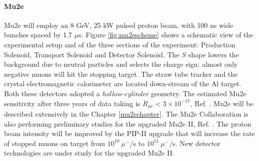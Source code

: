 \paragraph{Mu2e}
Mu2e will employ an 8 GeV, 25 kW pulsed proton beam, with 100 ns wide bunches spaced by 1.7 $\mu$s. 
Figure \ref{fig:mu2escheme} shows a schematic view of the experimental setup and of the
three sections of the experiment: Production Solenoid, Transport
Solenoid and Detector Solenoid. The $S$ shape lowers the background due to 
neutral particles and selects the charge sign: almost only negative muons will hit the stopping target. 
The straw tube tracker and the crystal electromagnetic calorimeter are located down-stream of the Al target. 
Both these detectors adopted a \textit{hollow-cylinder} geometry. 
The estimated Mu2e sensitivity after three years of data taking is $R_{\mu e} < 3 \times 10^{-17}$, Ref. \cite{universe9010054}.
Mu2e will be described extensively in the Chapter \ref{mu2echapter}.
The Mu2e Collaboration is also performing preliminary studies for the upgraded Mu2e II, Ref. \cite{dukes}. 
The proton beam intensity will be improved by the PIP-II upgrade that will increase the rate of stopped muons 
on target from $10^{10} \ \mu^-$/s to $10^{11} \ \mu^-$/s. New detector technologies are under study for the upgraded
Mu2e II.
